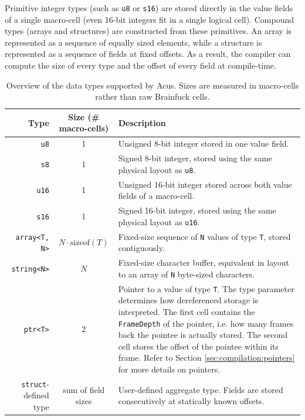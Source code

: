 Primitive integer types (such as \texttt{u8} or \texttt{s16}) are stored directly in the value fields of a single macro-cell (even 16-bit integers fit in a single logical cell). Compound types (arrays and structures) are constructed from these primitives. An array is represented as a sequence of equally sized elements, while a structure is represented as a sequence of fields at fixed offsets. As a result, the compiler can compute the size of every type and the offset of every field at compile-time.

\begin{table}[H]
\centering
\begin{tabularx}{\textwidth}{r c X}
\hline
\textbf{Type} & \textbf{Size (\# macro-cells)} & \textbf{Description} \\
\hline
\texttt{u8} &
1 &
Unsigned 8-bit integer stored in one value field. \\

\texttt{s8} &
1 &
Signed 8-bit integer, stored using the same physical layout as \texttt{u8}. \\

\texttt{u16} &
1 &
Unsigned 16-bit integer stored across both value fields of a macro-cell. \\

\texttt{s16} &
1 &
Signed 16-bit integer, stored using the same physical layout as \texttt{u16}. \\

\texttt{array<T, N>} &
$N \cdot \mathrm{sizeof}(T)$ &
Fixed-size sequence of \texttt{N} values of type \texttt{T}, stored contiguously. \\

\texttt{string<N>} &
$N$ &
Fixed-size character buffer, equivalent in layout to an array of \texttt{N} byte-sized characters. \\

\texttt{ptr<T>} &
2 &
Pointer to a value of type \texttt{T}. The type parameter determines how dereferenced storage is interpreted. The first cell contains the \texttt{FrameDepth} of the pointer, i.e. how many frames back the pointee is actually stored. The second cell stores the offset of the pointee within its frame. Refer to Section \ref{sec:compilation:pointers} for more details on pointers. \\

\texttt{struct}-defined type &
sum of field sizes &
User-defined aggregate type. Fields are stored consecutively at statically known offsets. \\
\hline
\end{tabularx}
\caption{Overview of the data types supported by Acus. Sizes are measured in macro-cells rather than raw Brainfuck cells.}
\label{tab:acus-types}
\end{table}

